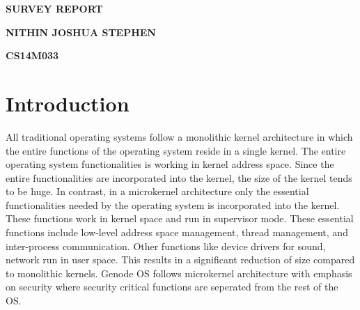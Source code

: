\documentclass[12pt]{article}
\date{}
\theoremstyle{plain}
\begin{document}
\centerline{ \huge{\bf SURVEY REPORT}}
\centerline{{\bf NITHIN JOSHUA STEPHEN}}
\centerline{{\bf CS14M033}}
\vspace{0.4cm}
\section*{Introduction}
All traditional operating systems follow a monolithic kernel architecture in which the entire functions of the operating system reside in a single kernel. The entire operating system functionalities is working in kernel address space. Since the entire functionalities are incorporated into the kernel, the size of the kernel tends to be huge. In contrast, in a  microkernel architecture only the essential functionalities needed by the operating system is incorporated into the kernel. These functions work in kernel space and run in supervisor mode. These essential functions include  low-level address space management, thread management, and inter-process communication. Other functions like device drivers for sound, network run in user space. This results in a significant reduction of size compared to monolithic kernels. Genode OS follows microkernel architecture with emphasis on security where security critical functions are seperated from the rest of the OS. 
\end{document}
